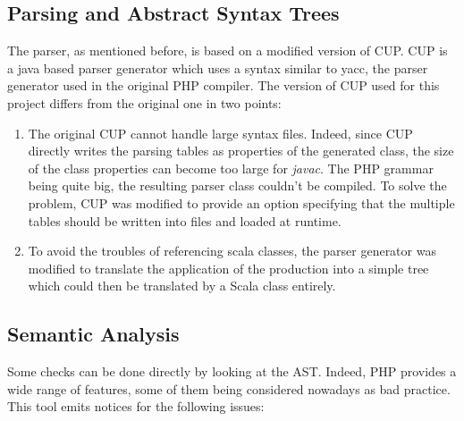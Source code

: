 \documentclass[a4paper]{article}
\begin{document}
\subsection{Parsing and Abstract Syntax Trees}
The parser, as mentioned before, is based on a modified version of CUP. CUP is
a java based parser generator which uses a syntax similar to yacc, the parser
generator used in the original PHP compiler. The version of CUP used for this
project differs from the original one in two points:
\begin{enumerate}
  \item The original CUP cannot handle large syntax files. Indeed, since CUP
    directly writes the parsing tables as properties of the generated class,
    the size of the class properties can become too large for \emph{javac}. The
    PHP grammar being quite big, the resulting parser class couldn't be compiled.
    To solve the problem, CUP was modified to provide an option specifying that
    the multiple tables should be written into files and loaded at runtime.
  \item To avoid the troubles of referencing scala classes, the parser
    generator was modified to translate the application of the production into a
    simple tree which could then be translated by a Scala class entirely.
\end{enumerate}

\subsection{Semantic Analysis}
Some checks can be done directly by looking at the AST. Indeed, PHP provides a
wide range of features, some of them being considered nowadays as bad practice.
This tool emits notices for the following issues:
\end{document}
